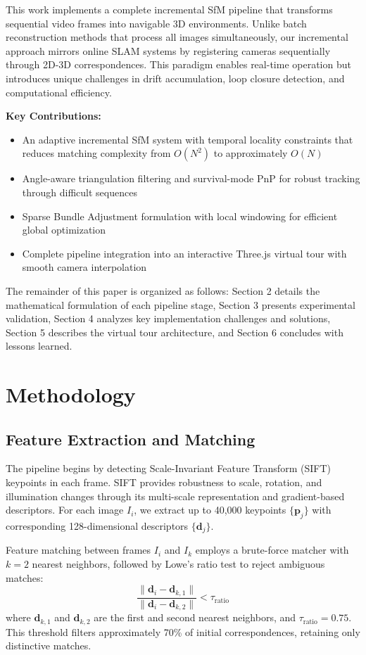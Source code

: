 \documentclass[10pt,twocolumn,letterpaper]{article}
\begin{document}
This work implements a complete incremental SfM pipeline that transforms sequential video frames into navigable 3D environments. Unlike batch reconstruction methods that process all images simultaneously, our incremental approach mirrors online SLAM systems by registering cameras sequentially through 2D-3D correspondences. This paradigm enables real-time operation but introduces unique challenges in drift accumulation, loop closure detection, and computational efficiency.

\textbf{Key Contributions:}
\begin{itemize}
\item An adaptive incremental SfM system with temporal locality constraints that reduces matching complexity from $O(N^2)$ to approximately $O(N)$
\item Angle-aware triangulation filtering and survival-mode PnP for robust tracking through difficult sequences
\item Sparse Bundle Adjustment formulation with local windowing for efficient global optimization
\item Complete pipeline integration into an interactive Three.js virtual tour with smooth camera interpolation
\end{itemize}

The remainder of this paper is organized as follows: Section 2 details the mathematical formulation of each pipeline stage, Section 3 presents experimental validation, Section 4 analyzes key implementation challenges and solutions, Section 5 describes the virtual tour architecture, and Section 6 concludes with lessons learned.

\section{Methodology}

\subsection{Feature Extraction and Matching}

The pipeline begins by detecting Scale-Invariant Feature Transform (SIFT) keypoints in each frame. SIFT provides robustness to scale, rotation, and illumination changes through its multi-scale representation and gradient-based descriptors. For each image $I_i$, we extract up to 40,000 keypoints $\{\mathbf{p}_j\}$ with corresponding 128-dimensional descriptors $\{\mathbf{d}_j\}$.

Feature matching between frames $I_i$ and $I_k$ employs a brute-force matcher with $k=2$ nearest neighbors, followed by Lowe's ratio test to reject ambiguous matches:
\begin{equation}
\frac{\|\mathbf{d}_i - \mathbf{d}_{k,1}\|}{\|\mathbf{d}_i - \mathbf{d}_{k,2}\|} < \tau_{\text{ratio}}
\end{equation}
where $\mathbf{d}_{k,1}$ and $\mathbf{d}_{k,2}$ are the first and second nearest neighbors, and $\tau_{\text{ratio}} = 0.75$. This threshold filters approximately 70\% of initial correspondences, retaining only distinctive matches.
\end{document}
